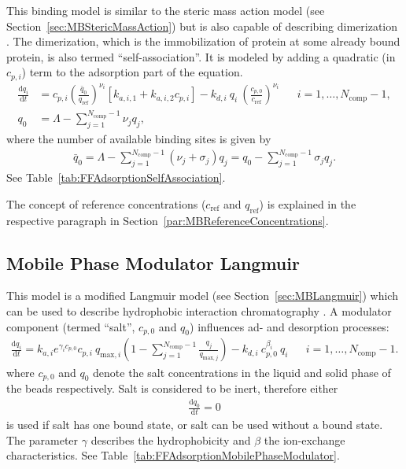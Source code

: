 This binding model is similar to the steric mass action model (see Section~\ref{sec:MBStericMassAction}) but is also capable of describing dimerization \cite{Mollerup2008,Westerberg2012}. 
The dimerization, which is the immobilization of protein at some already bound protein, is also termed ``self-association''.
It is modeled by adding a quadratic (in $c_{p,i}$) term to the adsorption part of the equation.
\begin{align*}
  \frac{\mathrm{d} q_i}{\mathrm{d} t} &= c_{p,i}\left( \frac{\bar{q}_0}{q_{\text{ref}}} \right)^{\nu_i} \left[ k_{a,i,1} + k_{a,i,2} c_{p,i} \right] - k_{d,i}\: q_i\: \left(\frac{c_{p,0}}{c_{\text{ref}}}\right)^{\nu_i} && i = 1, \dots, N_{\text{comp}} - 1, \\
  q_0 &= \Lambda - \sum_{j=1}^{N_{\text{comp}} - 1} \nu_j q_j,
\end{align*}
where the number of available binding sites is given by
\begin{align*}
  \bar{q}_0 = \Lambda - \sum_{j=1}^{N_{\text{comp}} - 1} \left( \nu_j + \sigma_j \right) q_j = q_0 - \sum_{j=1}^{N_{\text{comp}} - 1} \sigma_j q_j.
\end{align*}
See Table~\ref{tab:FFAdsorptionSelfAssociation}.

The concept of reference concentrations ($c_{\text{ref}}$ and $q_{\text{ref}}$) is explained in the respective paragraph in Section~\ref{par:MBReferenceConcentrations}.

\subsection{Mobile Phase Modulator Langmuir}\label{sec:MBMobilePhaseModulatorLangmuir}

This model is a modified Langmuir model (see Section~\ref{sec:MBLangmuir}) which can be used to describe hydrophobic interaction chromatography \cite{Melander1989,Karlsson2004}. 
A modulator component (termed ``salt'', $c_{p,0}$ and $q_0$) influences ad- and desorption processes:
\begin{align*}
  \frac{\mathrm{d} q_i}{\mathrm{d} t} = k_{a,i} e^{\gamma_i c_{p,0}} c_{p,i}\: q_{\text{max},i} \left( 1 - \sum_{j=1}^{N_{\text{comp}} - 1} \frac{q_j}{q_{\text{max},j}} \right) - k_{d,i} \: c_{p,0}^{\beta_i} \: q_i && i = 1, \dots, N_{\text{comp}} - 1.
\end{align*}
where $c_{p,0}$ and $q_0$ denote the salt concentrations in the liquid and solid phase of the beads respectively. 
Salt is considered to be inert, therefore either
\begin{align*}
  \frac{\mathrm{d} q_0}{\mathrm{d} t} = 0
\end{align*}
is used if salt has one bound state, or salt can be used without a bound state.
The parameter $\gamma$ describes the hydrophobicity and $\beta$ the ion-exchange characteristics.
See Table~\ref{tab:FFAdsorptionMobilePhaseModulator}.

